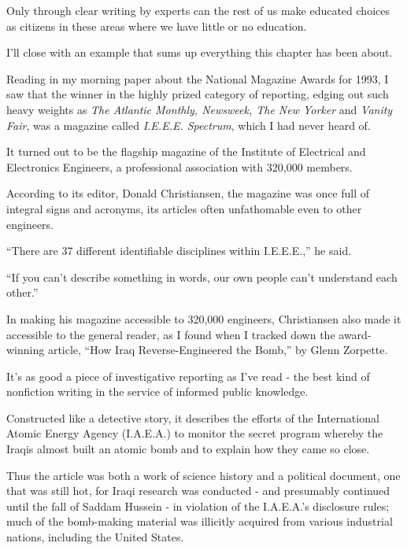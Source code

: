 \documentclass{book}
\numberwithin{equation}{section}
\begin{document}
Only through clear writing by experts can the rest of us make educated choices as citizens in these areas where we have little or no education.

%
I'll close with an example that sums up everything this chapter has been about.

Reading in my morning paper about the National Magazine Awards for 1993, I saw that the winner in the highly prized category of reporting, edging out such heavy weights as \textit{The Atlantic Monthly, Newsweek, The New Yorker} and \textit{Vanity Fair}, was a magazine called \textit{I.E.E.E. Spectrum}, which I had never heard of.

It turned out to be the flagship magazine of the Institute of Electrical and Electronics Engineers, a professional association with 320,000 members.

According to its editor, Donald Christiansen, the magazine was once full of integral signs and acronyms, its articles often unfathomable even to other engineers.

``There are 37 different identifiable disciplines within I.E.E.E.,'' he said.

``If you can't describe something in words, our own people can't understand each other.''

%
In making his magazine accessible to 320,000 engineers, Christiansen also made it accessible to the general reader, as I found when I tracked down the award-winning article, ``How Iraq Reverse-Engineered the Bomb,'' by Glenn Zorpette.

It's as good a piece of investigative reporting as I've read - the best kind of nonfiction writing in the service of informed public knowledge.

Constructed like a detective story, it describes the efforts of the International Atomic Energy Agency (I.A.E.A.) to monitor the secret program whereby the Iraqis almost built an atomic bomb and to explain how they came so close.

Thus the article was both a work of science history and a political document, one that was still hot, for Iraqi research was conducted - and presumably continued until the fall of Saddam Hussein - in violation of the I.A.E.A.'s disclosure rules; much of the bomb-making material was illicitly acquired from various industrial nations, including the United States.
\end{document}
